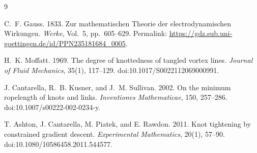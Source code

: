 \begin{thebibliography}{9}

C.~F. Gauss. 1833.
\newblock Zur mathematischen Theorie der electrodynamischen Wirkungen.
\newblock \emph{Werke}, Vol.~5, pp.~605--629.
\newblock Permalink: \url{https://gdz.sub.uni-goettingen.de/id/PPN235181684_0005}.

H.~K. Moffatt. 1969.
\newblock The degree of knottedness of tangled vortex lines.
\newblock \emph{Journal of Fluid Mechanics}, 35(1), 117--129.
\newblock doi:10.1017/S0022112069000991.

J. Cantarella, R.~B. Kusner, and J.~M. Sullivan. 2002.
\newblock On the minimum ropelength of knots and links.
\newblock \emph{Inventiones Mathematicae}, 150, 257--286.
\newblock doi:10.1007/s00222-002-0234-y.

T. Ashton, J. Cantarella, M. Piatek, and E. Rawdon. 2011.
\newblock Knot tightening by constrained gradient descent.
\newblock \emph{Experimental Mathematics}, 20(1), 57--90.
\newblock doi:10.1080/10586458.2011.544577.

\end{thebibliography}
